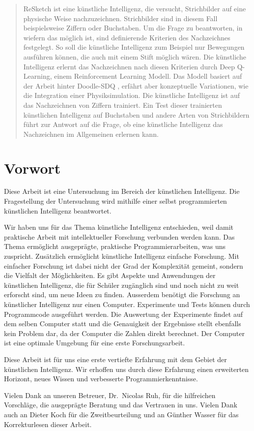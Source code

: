 \begin{abstract}\label{abstract} ReSketch ist eine künstliche Intelligenz, die
versucht, Strichbilder auf eine physische Weise nachzuzeichnen. Strichbilder
sind in diesem Fall beispielsweise Ziffern oder Buchstaben. Um die Frage zu
beantworten, in wiefern das möglich ist, sind definierende Kriterien des
Nachzeichnes festgelegt. So soll die künstliche Intelligenz zum Beispiel nur
Bewegungen ausführen können, die auch mit einem Stift möglich wären. Die
künstliche Intelligenz erlernt das Nachzeichnen nach diesen Kriterien durch Deep
Q-Learning, einem Reinforcement Learning Modell. Das Modell basiert auf der
Arbeit hinter Doodle-SDQ \cite{zhou_learning_2018}, erfährt aber konzeptuelle
Variationen, wie die Integration einer Physiksimulation. Die künstliche
Intelligenz ist auf das Nachzeichnen von Ziffern trainiert. Ein Test dieser
trainierten künstlichen Intelligenz auf Buchstaben und andere Arten von
Strichbildern führt zur Antwort auf die Frage, ob eine künstliche Intelligenz
das Nachzeichnen im Allgemeinen erlernen kann.
\end{abstract}

\newpage

\section*{Vorwort}\label{vorwort} Diese Arbeit ist eine Untersuchung im Bereich
der künstlichen Intelligenz. Die Fragestellung der Untersuchung wird mithilfe
einer selbst programmierten künstlichen Intelligenz beantwortet. 

Wir haben uns für das Thema künstliche Intelligenz entschieden, weil damit
praktische Arbeit mit intellektueller Forschung verbunden werden kann. Das Thema
ermöglicht ausgeprägte, praktische Programmierarbeiten, was uns zuspricht.
Zusätzlich ermöglicht künstliche Intelligenz einfache Forschung. Mit einfacher
Forschung ist dabei nicht der Grad der Komplexität gemeint, sondern die Vielfalt
der Möglichkeiten. Es gibt Aspekte und Anwendungen der künstlichen Intelligenz,
die für Schüler zugänglich sind und noch nicht zu weit erforscht sind, um neue
Ideen zu finden. Ausserdem benötigt die Forschung an künstlicher Intelligenz nur
einen Computer. Experimente und Tests können durch Programmcode ausgeführt
werden. Die Auswertung der Experimente findet auf dem selben Computer statt und
die Genauigkeit der Ergebnisse stellt ebenfalls kein Problem dar, da der
Computer die Zahlen direkt berechnet. Der Computer ist eine optimale Umgebung
für eine erste Forschungsarbeit.

Diese Arbeit ist für uns eine erste vertiefte Erfahrung mit dem Gebiet der
künstlichen Intelligenz. Wir erhoffen uns durch diese Erfahrung einen
erweiterten Horizont, neues Wissen und verbesserte Programmierkenntnisse.

Vielen Dank an unseren Betreuer, Dr.\ Nicolas Ruh, für die hilfreichen
Vorschläge, die ausgeprägte Beratung und das Vertrauen in uns. Vielen Dank auch
an Dieter Koch für die Zweitbeurteilung und an Günther Wasser für das
Korrekturlesen dieser Arbeit.
